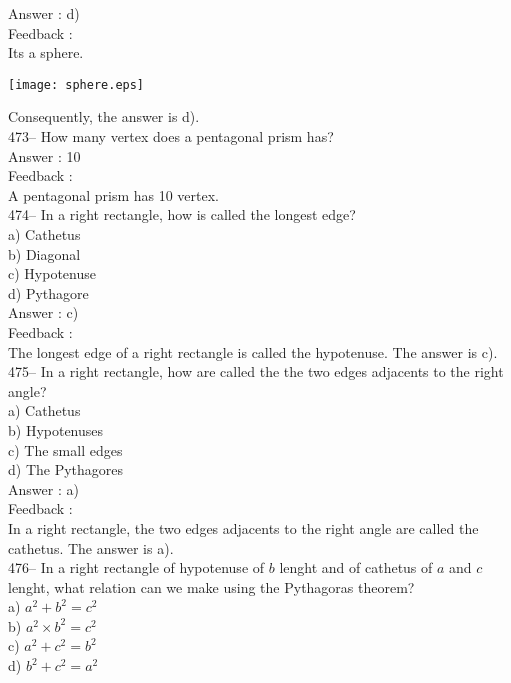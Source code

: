 \documentclass[letterpaper, 12pt]{article}
\begin{document}
Answer : d)\\

Feedback : \\
Its a sphere.
    \begin{center}
    \texttt{[image: sphere.eps]}
    \end{center}

Consequently, the answer is d).\\

473-- How many vertex does a pentagonal prism has?\\

Answer : 10\\

Feedback : \\
A pentagonal prism has 10 vertex. \\


474-- In a right rectangle, how is called the longest edge?\\
a) Cathetus\\
b) Diagonal\\
c) Hypotenuse\\
d) Pythagore\\

Answer :  c)\\

Feedback : \\
The longest edge of a right rectangle is called the hypotenuse.
The answer is c).\\


475-- In a right rectangle, how are called the the two edges adjacents to the right angle?\\
a) Cathetus\\
b) Hypotenuses\\
c) The small edges\\
d) The Pythagores\\

Answer :  a)\\

Feedback : \\
In a right rectangle, the two edges adjacents to the right angle are called the cathetus.  The answer is a).\\

476-- In a right rectangle of hypotenuse of $b$ lenght and of cathetus of $a$ and $c$ lenght, what relation can we make using the Pythagoras theorem?\\
a) $a^{2}+b^{2}=c^{2}$\\
b) $a^{2}\times b^{2}=c^{2}$\\
c) $a^{2}+c^{2}=b^{2}$\\
d) $b^{2}+c^{2}=a^{2}$\\
\end{document}
